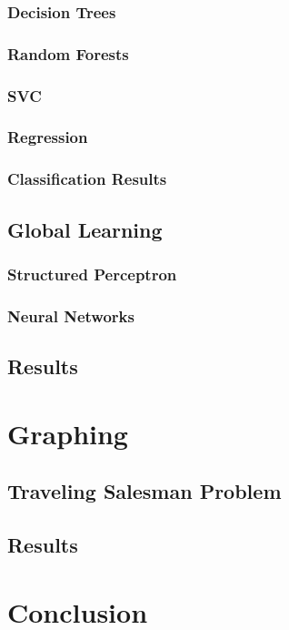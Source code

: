 \documentclass[bsc,frontabs,twoside,singlespacing,parskip,deptreport]{infthesis}     %
\begin{document}
\subsection{Decision Trees}
\subsection{Random Forests}
\subsection{SVC}
\subsection{Regression}
\subsection{Classification Results}

\section{Global Learning}
\subsection{Structured Perceptron}
\subsection{Neural Networks}

\section{Results}

\chapter{Graphing}
\section{Traveling Salesman Problem}

\section{Results}

\chapter{Conclusion}



\end{document}

